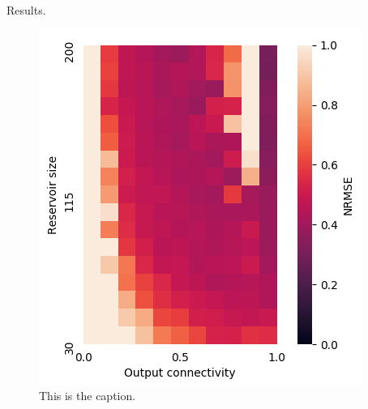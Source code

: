 Results.

\begin{figure}[H]
  \centering
  \includegraphics[scale = 0.4]{img/reservoir_size_output_sparsity.png}
  \caption{This is the caption.}
  \label{fig:isicheatpmap}
\end{figure}


